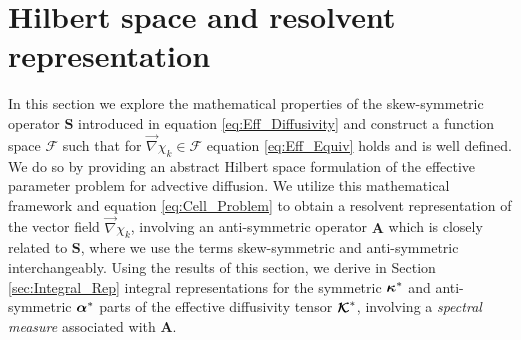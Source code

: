 \documentclass[11pt]{amsart}
\newcommand{\Sb}{\mathbf{S}}
\newcommand{\Ab}{\mathbf{A}}
\newcommand\Kbc{\mbox{\boldmath${\mathcal{K}}$}}
\newcommand{\Fs}{\mathscr{F}}
\newcommand\balpha{\mbox{\boldmath${\alpha}$}}
\newcommand\bkappa{\mbox{\boldmath${\kappa}$}}
\begin{document}
\section{Hilbert space and resolvent
  representation} \label{sec:Hilbert_Space}   
%
In this section we explore the mathematical properties of the
skew-symmetric operator $\Sb$ introduced in equation
\eqref{eq:Eff_Diffusivity} and construct a function space $\Fs$ such
that for $\vec{\nabla}\chi_k\in\Fs$ equation \eqref{eq:Eff_Equiv} holds and is
well defined. We do so by providing an abstract Hilbert space
formulation of the effective parameter problem for advective
diffusion. We utilize this mathematical framework and equation
\eqref{eq:Cell_Problem}  to obtain a resolvent representation of the
vector field $\vec{\nabla}\chi_k$, involving an anti-symmetric operator $\Ab$
which is closely related to $\Sb$, where we use the terms
skew-symmetric and anti-symmetric interchangeably. Using the results
of this section, we derive in Section \ref{sec:Integral_Rep} integral
representations for the symmetric $\bkappa^*$ and anti-symmetric
$\balpha^*$ parts of the effective diffusivity tensor $\Kbc^*$,
involving a \emph{spectral measure} associated with $\Ab$.       
\end{document}
